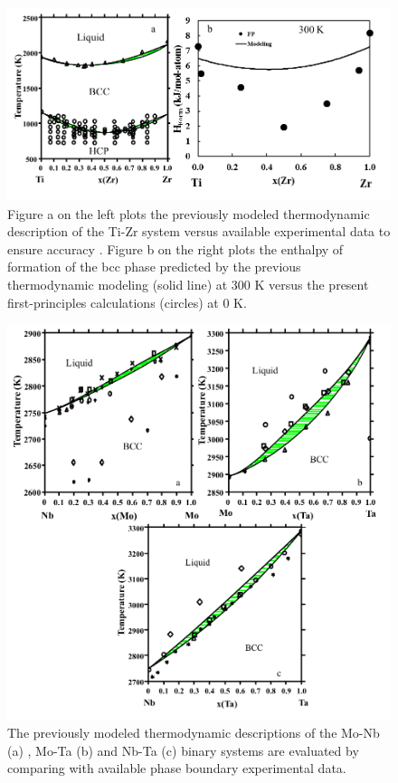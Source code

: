 \newpage
\begin{figure}[H]
	\centering
	\includegraphics[width=\textwidth]{Chapter-3/Figures/TiZr.png}
	\caption{Figure a on the left plots the previously modeled thermodynamic description of the Ti-Zr system versus available experimental data to ensure accuracy \cite{Kumar1994a}. Figure b on the right plots the enthalpy of formation of the bcc phase predicted by the previous thermodynamic modeling (solid line) at 300 K versus the present first-principles calculations (circles) at 0 K.
	}
	\label{Ch3-figure:TiZr}
\end{figure}

\newpage
\begin{figure}[H]
	\centering
	\includegraphics[width=\textwidth]{Chapter-3/Figures/binary1.png}
	\caption{The previously modeled thermodynamic descriptions of the Mo-Nb (a) \cite{Xiong2004}, Mo-Ta (b) \cite{Xiong2004} and Nb-Ta (c) \cite{Xiong2004} binary systems are evaluated by comparing with available phase boundary experimental data.}
	\label{Ch3-figure:binary1}
\end{figure}

